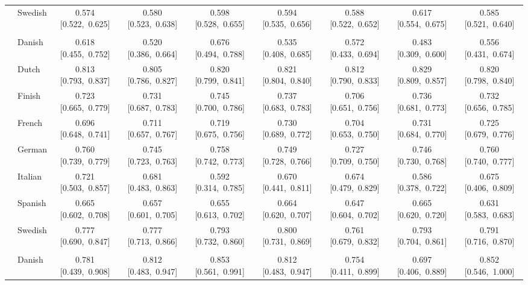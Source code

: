 \begin{longtable}[t]{llccccccc}
 & Swedish & 0.574 [0.522,~0.625] & 0.580 [0.523,~0.638] & 0.598 [0.528,~0.655] & 0.594 [0.535,~0.656] & 0.588 [0.522,~0.652] & 0.617 [0.554,~0.675] & 0.585 [0.521,~0.640]\\

\addlinespace[3pt]
\multicolumn{9}{p{\linewidth}}{\cellcolor[HTML]{DCDCDC}{classify the stance expressed in quasi-sentence \(binary)}}\\
\addlinespace & Danish & 0.618 [0.455,~0.752] & 0.520 [0.386,~0.664] & 0.676 [0.494,~0.788] & 0.535 [0.408,~0.685] & 0.572 [0.433,~0.694] & 0.483 [0.309,~0.600] & 0.556 [0.431,~0.674]\\

 & Dutch & 0.813 [0.793,~0.837] & 0.805 [0.786,~0.827] & 0.820 [0.799,~0.841] & 0.821 [0.804,~0.840] & 0.812 [0.790,~0.833] & 0.829 [0.809,~0.857] & 0.820 [0.798,~0.840]\\

 & Finish & 0.723 [0.665,~0.779] & 0.731 [0.687,~0.783] & 0.745 [0.700,~0.786] & 0.737 [0.683,~0.783] & 0.706 [0.651,~0.756] & 0.736 [0.681,~0.773] & 0.732 [0.656,~0.785]\\

 & French & 0.696 [0.648,~0.741] & 0.711 [0.657,~0.767] & 0.719 [0.675,~0.756] & 0.730 [0.689,~0.772] & 0.704 [0.653,~0.750] & 0.731 [0.684,~0.770] & 0.725 [0.679,~0.776]\\

 & German & 0.760 [0.739,~0.779] & 0.745 [0.723,~0.763] & 0.758 [0.742,~0.773] & 0.749 [0.728,~0.766] & 0.727 [0.709,~0.750] & 0.746 [0.730,~0.768] & 0.760 [0.740,~0.777]\\

 & Italian & 0.721 [0.503,~0.857] & 0.681 [0.483,~0.863] & 0.592 [0.314,~0.785] & 0.670 [0.441,~0.811] & 0.674 [0.479,~0.829] & 0.586 [0.378,~0.722] & 0.675 [0.406,~0.809]\\

 & Spanish & 0.665 [0.602,~0.708] & 0.657 [0.601,~0.705] & 0.655 [0.613,~0.702] & 0.664 [0.620,~0.707] & 0.647 [0.604,~0.702] & 0.665 [0.620,~0.720] & 0.631 [0.583,~0.683]\\

 & Swedish & 0.777 [0.690,~0.847] & 0.777 [0.713,~0.866] & 0.793 [0.732,~0.860] & 0.800 [0.731,~0.869] & 0.761 [0.679,~0.832] & 0.793 [0.704,~0.861] & 0.791 [0.716,~0.870]\\

\addlinespace[3pt]
\multicolumn{9}{p{\linewidth}}{\cellcolor[HTML]{DCDCDC}{classify the stance expressed in quasi-sentences about economic issues \(binary)}}\\
\addlinespace & Danish & 0.781 [0.439,~0.908] & 0.812 [0.483,~0.947] & 0.853 [0.561,~0.991] & 0.812 [0.483,~0.947] & 0.754 [0.411,~0.899] & 0.697 [0.406,~0.889] & 0.852 [0.546,~1.000]\\


\end{longtable}
